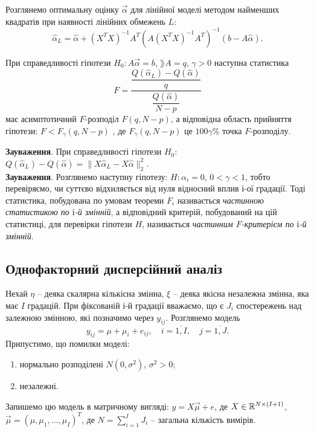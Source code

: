 Розглянемо оптимальну оцінку $\vec\alpha$ для лінійної моделі методом найменших квадратів при наявності лінійних обмежень $L$: \[ \widehat\alpha_L=\widehat\alpha+(X^TX)^{-1}A^T(A(X^TX)^{-1}A^T)^{-1}(b-A\widehat{\alpha}). \]
\begin{theorem}
	При справедливості гіпотези $H_0:A\vec\alpha=b$, $\rang  A=q$, $\gamma>0$ наступна статистика \[ F = \dfrac{\dfrac{Q(\widehat{\alpha}_L)-Q(\widehat{\alpha})}{q}}{\dfrac{Q(\widehat{\alpha})}{N-p}}\] має асимптотичний $F$-розподіл $F(q, N - p)$, а відповідна область прийняття гіпотези: $F < F_\gamma (q, N - p)$ , де $F_\gamma (q, N - p)$ це $100\gamma\%$ точка $F$-розподілу.
\end{theorem}
\textbf{Зауваження}. При справедливості гіпотези $H_0$: $Q(\widehat{\alpha}_L)-Q(\widehat{\alpha})=\|X\widehat{\alpha}_L-X\widehat{\alpha}\|_2^2$. \\

\textbf{Зауваження}. Розглянемо наступну гіпотезу: $H: \alpha_i = 0$, $0<\gamma<1$, тобто перевіряємо, чи суттєво відхиляється від нуля відносний вплив $і$-ої градації. Тоді статистика, побудована по умовам теореми $F_i$ називається \textit{частинною статистикою по $і$-й змінній}, а відповідний критерій, побудований на цій статистиці, для перевірки гіпотези $H$, називається \textit{частинним $F$-критерієм по $і$-й змінній}.
\subsection{Однофакторний дисперсійний аналіз}
Нехай $\eta$ -- деяка скалярна кількісна змінна, $\xi$ -- деяка якісна незалежна змінна, яка має $I$ градацій. При фіксованій $і$-й градації вважаємо, що є $J_i$ спостережень над залежною змінною, які позначимо через $y_{ij}$. Розглянемо модель \[y_{ij}= \mu + \mu_i + e_{ij}, \quad i = \overline{1,I}, \quad j = \overline{1, J}. \]
Припустимо, що помилки моделі:
\begin{enumerate}
	\item нормально розподілені $N(0,\sigma^2)$, $\sigma^2 > 0$;
	\item незалежні.
\end{enumerate}
Запишемо цю модель в матричному вигляді: $y = X \vec\mu + e$, де $X \in \mathbb{R}^{N\times(I+1)}$, $\vec\mu=(\mu,\mu_1,\ldots,\mu_I)^T$, де $N = \sum_{i=1}^I J_i$ -- загальна кількість вимірів.